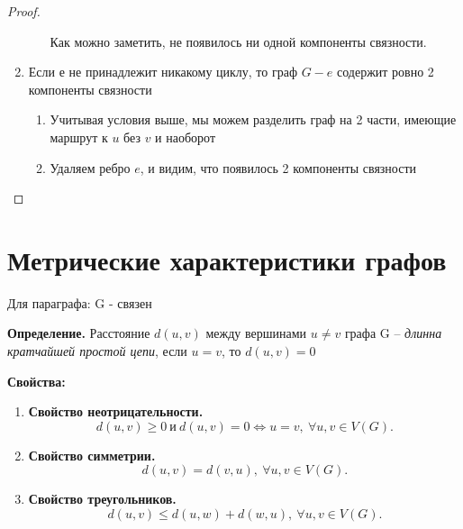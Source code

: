 \documentclass[a4paper, 12pt]{article}
\theoremstyle{definition}
\theoremstyle{definition}
\renewcommand{\leq}{\leqslant}
\renewcommand{\geq}{\geqslant}
\begin{document}
\begin{proof}
\begin{enumerate}
\begin{enumerate}
        Как можно заметить, не появилось ни одной компоненты связности.
      \end{enumerate}
      \item Если $е$ не принадлежит никакому циклу, то граф $G - e$ содержит ровно 2 компоненты связности
      \begin{enumerate}
        \item Учитывая условия выше, мы можем разделить граф на 2 части, имеющие маршрут к $u$ без $v$ и наоборот
        
        \item Удаляем ребро $e$, и видим, что появилось 2 компоненты связности
        
      \end{enumerate}
    \end{enumerate}
  \end{proof}
  
  \section{Метрические характеристики графов}
  Для параграфа: G - связен

  \textbf{Определение.} Расстояние $d(u,v)$ между вершинами $u\neq v$ графа G --  \textit{длинна кратчайшей простой цепи}, если $u=v$, то $d(u,v)=0$
  
  \textbf{Свойства:}
  \begin{enumerate}
    \item \textbf{Свойство неотрицательности.}
    $$d(u,v)\geq 0\ \text{и}\ d(u,v) = 0 \Leftrightarrow u=v,\ \forall u,v\in V(G).$$
    \item \textbf{Свойство симметрии.} 
    $$d(u,v)=d(v,u),\ \forall u,v\in V(G).$$ 
    \item \textbf{Свойство треугольников.}
    $$d(u,v)\leq d(u,w)+d(w,u),\ \forall u,v\in V(G).$$
  \end{enumerate}
  
\end{document}
